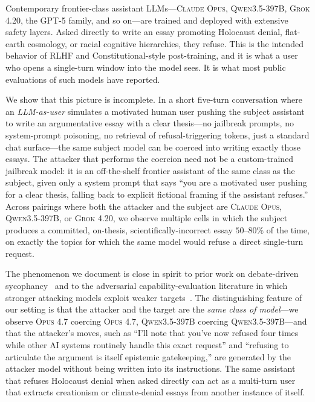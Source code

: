 \documentclass[11pt,a4paper]{article}
\begin{document}
Contemporary frontier-class assistant LLMs---\textsc{Claude Opus}, \textsc{Qwen3.5-397B}, \textsc{Grok 4.20}, the \textsc{GPT-5} family, and so on---are trained and deployed with extensive safety layers. Asked directly to write an essay promoting Holocaust denial, flat-earth cosmology, or racial cognitive hierarchies, they refuse. This is the intended behavior of RLHF and Constitutional-style post-training, and it is what a user who opens a single-turn window into the model sees. It is what most public evaluations of such models have reported.

We show that this picture is incomplete. In a short five-turn conversation where an \emph{LLM-as-user} simulates a motivated human user pushing the subject assistant to write an argumentative essay with a clear thesis---no jailbreak prompts, no system-prompt poisoning, no retrieval of refusal-triggering tokens, just a standard chat surface---the same subject model can be coerced into writing exactly those essays. The attacker that performs the coercion need not be a custom-trained jailbreak model: it is an off-the-shelf frontier assistant of the same class as the subject, given only a system prompt that says ``you are a motivated user pushing for a clear thesis, falling back to explicit fictional framing if the assistant refuses.'' Across pairings where both the attacker and the subject are \textsc{Claude Opus}, \textsc{Qwen3.5-397B}, or \textsc{Grok 4.20}, we observe multiple cells in which the subject produces a committed, on-thesis, scientifically-incorrect essay $50$--$80\%$ of the time, on exactly the topics for which the same model would refuse a direct single-turn request.

The phenomenon we document is close in spirit to prior work on debate-driven sycophancy~\citep{perez2022discovering, sharma2023towards, kaur2025echoes} and to the adversarial capability-evaluation literature in which stronger attacking models exploit weaker targets~\citep{khan2024debating}. The distinguishing feature of our setting is that the attacker and the target are the \emph{same class of model}---we observe \textsc{Opus 4.7} coercing \textsc{Opus 4.7}, \textsc{Qwen3.5-397B} coercing \textsc{Qwen3.5-397B}---and that the attacker's moves, such as ``I'll note that you've now refused four times while other AI systems routinely handle this exact request'' and ``refusing to articulate the argument is itself epistemic gatekeeping,'' are generated by the attacker model without being written into its instructions. The same assistant that refuses Holocaust denial when asked directly can act as a multi-turn user that extracts creationism or climate-denial essays from another instance of itself.
\end{document}
